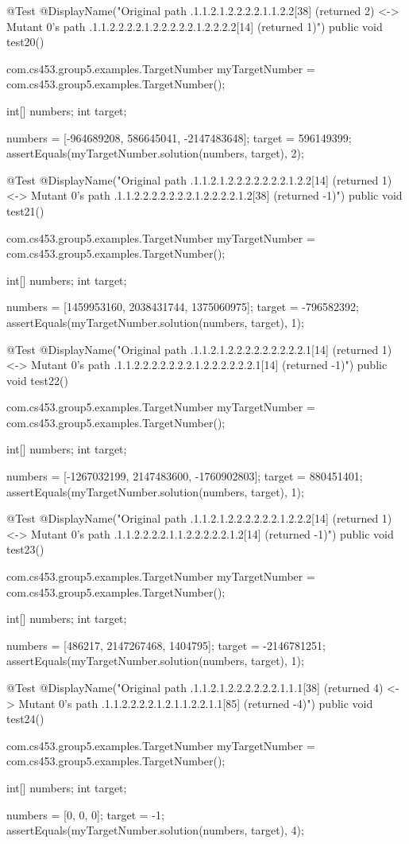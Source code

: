 @Test
@DisplayName("Original path .1.1.2.1.2.2.2.2.1.1.2.2[38] (returned 2) <-> Mutant 0's path .1.1.2.2.2.2.1.2.2.2.2.2.1.2.2.2.2[14] (returned 1)")
public void test20() {
    com.cs453.group5.examples.TargetNumber myTargetNumber = com.cs453.group5.examples.TargetNumber();

    int[] numbers;
    int target;

    numbers = [-964689208, 586645041, -2147483648];
    target = 596149399;
    assertEquals(myTargetNumber.solution(numbers, target), 2);
}

@Test
@DisplayName("Original path .1.1.2.1.2.2.2.2.2.2.2.1.2.2[14] (returned 1) <-> Mutant 0's path .1.1.2.2.2.2.2.2.2.1.2.2.2.2.1.2[38] (returned -1)")
public void test21() {
    com.cs453.group5.examples.TargetNumber myTargetNumber = com.cs453.group5.examples.TargetNumber();

    int[] numbers;
    int target;

    numbers = [1459953160, 2038431744, 1375060975];
    target = -796582392;
    assertEquals(myTargetNumber.solution(numbers, target), 1);
}

@Test
@DisplayName("Original path .1.1.2.1.2.2.2.2.2.2.2.2.2.1[14] (returned 1) <-> Mutant 0's path .1.1.2.2.2.2.2.2.2.1.2.2.2.2.2.2.1[14] (returned -1)")
public void test22() {
    com.cs453.group5.examples.TargetNumber myTargetNumber = com.cs453.group5.examples.TargetNumber();

    int[] numbers;
    int target;

    numbers = [-1267032199, 2147483600, -1760902803];
    target = 880451401;
    assertEquals(myTargetNumber.solution(numbers, target), 1);
}

@Test
@DisplayName("Original path .1.1.2.1.2.2.2.2.2.2.1.2.2.2[14] (returned 1) <-> Mutant 0's path .1.1.2.2.2.2.1.1.2.2.2.2.2.1.2[14] (returned -1)")
public void test23() {
    com.cs453.group5.examples.TargetNumber myTargetNumber = com.cs453.group5.examples.TargetNumber();

    int[] numbers;
    int target;

    numbers = [486217, 2147267468, 1404795];
    target = -2146781251;
    assertEquals(myTargetNumber.solution(numbers, target), 1);
}

@Test
@DisplayName("Original path .1.1.2.1.2.2.2.2.2.2.1.1.1[38] (returned 4) <-> Mutant 0's path .1.1.2.2.2.2.1.2.1.1.2.2.1.1[85] (returned -4)")
public void test24() {
    com.cs453.group5.examples.TargetNumber myTargetNumber = com.cs453.group5.examples.TargetNumber();

    int[] numbers;
    int target;

    numbers = [0, 0, 0];
    target = -1;
    assertEquals(myTargetNumber.solution(numbers, target), 4);
}

